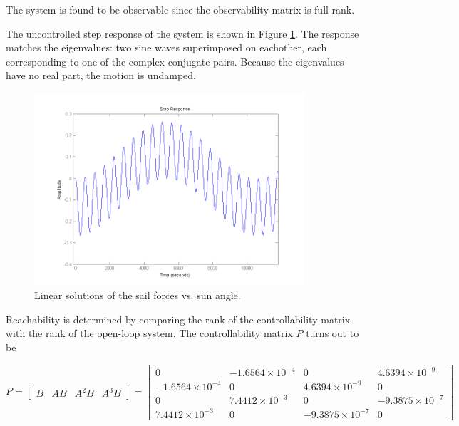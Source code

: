 \documentclass[]{aiaa-tc}%
\begin{document}
	\vspace{5 mm}

	The system is found to be observable since the observability matrix is full rank.

	\vspace{5 mm}

	The uncontrolled step response of the system is shown in Figure \ref{fig:StepResp}. The response matches the eigenvalues: two sine waves superimposed on eachother, each corresponding to one of the complex conjugate pairs. Because the eigenvalues have no real part, the motion is undamped.

	\vspace{5 mm}

	\begin{figure}[H]
		\centering
			\includegraphics[width = 10cm]{StepResponse.png}
		\caption{Linear solutions of the sail forces vs. sun angle. }
		\label{fig:StepResp}
	\end{figure}	

	Reachability is determined by comparing the rank of the controllability matrix with the rank of the open-loop system. The controllability matrix $P$ turns out to be 

	\begin{equation}
P=\begin{bmatrix}
B & AB & A^2B &A^3B 
\end{bmatrix}=\begin{bmatrix}
            0 &     -1.6564\times10^{-4} &             0 &    4.6394\times10^{-9}\\ 
  -1.6564\times10^{-4} &               0 &    4.6394\times10^{-9} &             0\\ 
            0 &      7.4412\times10^{-3} &             0 &   -9.3875\times10^{-7}\\ 
   7.4412\times10^{-3} &               0 &   -9.3875\times10^{-7} &             0
\end{bmatrix}
	\end{equation}
\end{document}
